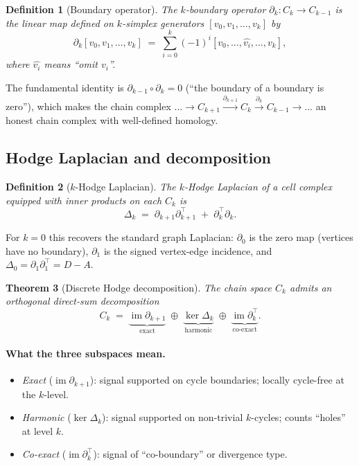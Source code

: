 \documentclass[11pt,a4paper]{article}
\newtheorem{theorem}{Theorem}[section]
\newtheorem{definition}[theorem]{Definition}
\theoremstyle{remark}
\DeclareMathOperator{\im}{im}
\begin{document}
\begin{definition}[Boundary operator]
The \emph{$k$-boundary operator} $\partial_k : C_k \to C_{k-1}$ is
the linear map defined on $k$-simplex generators
$[v_0, v_1, \dots, v_k]$ by
\[
  \partial_k [v_0, v_1, \dots, v_k] \;=\;
    \sum_{i = 0}^{k} (-1)^i [v_0, \dots, \widehat{v_i}, \dots, v_k],
\]
where $\widehat{v_i}$ means ``omit $v_i$''.
\end{definition}

The fundamental identity is $\partial_{k-1} \circ \partial_k = 0$
(``the boundary of a boundary is zero''), which makes the chain
complex
$\dots \to C_{k+1} \xrightarrow{\partial_{k+1}} C_k \xrightarrow{\partial_k} C_{k-1} \to \dots$
an honest chain complex with well-defined homology.

\subsection{Hodge Laplacian and decomposition}

\begin{definition}[$k$-Hodge Laplacian]
The \emph{$k$-Hodge Laplacian} of a cell complex equipped with
inner products on each $C_k$ is
\[
  \Delta_k \;=\; \partial_{k+1} \partial_{k+1}^\top
                 \;+\; \partial_k^\top \partial_k.
\]
\end{definition}

For $k = 0$ this recovers the standard graph Laplacian:
$\partial_0$ is the zero map (vertices have no boundary),
$\partial_1$ is the signed vertex-edge incidence, and
$\Delta_0 = \partial_1 \partial_1^\top = D - A$.

\begin{theorem}[Discrete Hodge decomposition]\label{thm:hodge-decomp}
The chain space $C_k$ admits an orthogonal direct-sum
decomposition
\[
  C_k \;=\; \underbrace{\im \partial_{k+1}}_{\text{exact}}
            \;\oplus\; \underbrace{\ker \Delta_k}_{\text{harmonic}}
            \;\oplus\; \underbrace{\im \partial_k^\top}_{\text{co-exact}}.
\]
\end{theorem}

\paragraph{What the three subspaces mean.}
\begin{itemize}
\item \emph{Exact} ($\im \partial_{k+1}$): signal supported on
      cycle boundaries; locally cycle-free at the $k$-level.
\item \emph{Harmonic} ($\ker \Delta_k$): signal supported on
      non-trivial $k$-cycles; counts ``holes'' at level $k$.
\item \emph{Co-exact} ($\im \partial_k^\top$): signal of
      ``co-boundary'' or divergence type.
\end{itemize}
\end{document}

